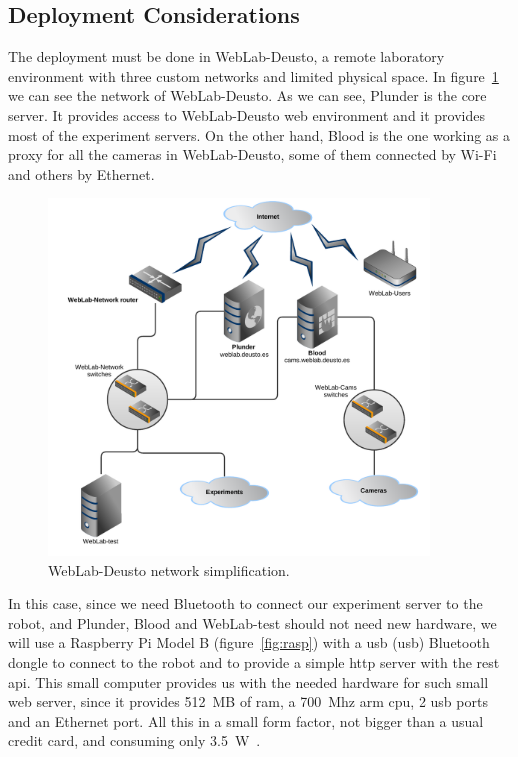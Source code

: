 \subsection{Deployment Considerations}

The deployment must be done in WebLab-Deusto, a remote laboratory environment with three custom
networks and limited physical space. In figure~\ref{fig:weblab-network} we can see the network of
WebLab-Deusto. As we can see, Plunder is the core server. It provides access to WebLab-Deusto web
environment and it provides most of the experiment servers. On the other hand, Blood is the one
working as a proxy for all the cameras in WebLab-Deusto, some of them connected by Wi-Fi and others
by Ethernet.

\begin{figure}[!htbp]
	\centering
	\includegraphics[width=0.9\textwidth]{fig/weblab-network}
	\caption{WebLab-Deusto network simplification.}\label{fig:weblab-network}
\end{figure}

In this case, since we need Bluetooth to connect our experiment server to the robot, and Plunder,
Blood and WebLab-test should not need new hardware, we will use a Raspberry Pi Model B
(figure~\ref{fig:rasp}) with a \acrshort{usb} (\acrlong{usb}) Bluetooth dongle to connect to the
robot and to provide a simple \acrshort{http} server with the \acrshort{rest} \acrshort{api}. This
small computer provides us with the needed hardware for such small web server, since it provides
512~MB of \acrshort{ram}, a 700~Mhz \acrshort{arm} \acrshort{cpu}, 2 \acrshort{usb} ports and an
Ethernet port. All this in a small form factor, not bigger than a usual credit card, and consuming
only 3.5~W~\cite{rasp_b}.

